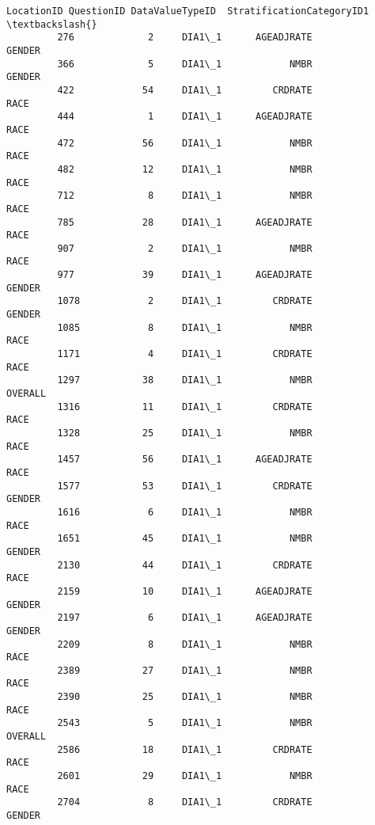 \documentclass[11pt]{article}
\begin{document}
\begin{Verbatim}[commandchars=\\\{\}]
                LocationID QuestionID DataValueTypeID  StratificationCategoryID1  \textbackslash{}
         276             2     DIA1\_1      AGEADJRATE                     GENDER   
         366             5     DIA1\_1            NMBR                     GENDER   
         422            54     DIA1\_1         CRDRATE                       RACE   
         444             1     DIA1\_1      AGEADJRATE                       RACE   
         472            56     DIA1\_1            NMBR                       RACE   
         482            12     DIA1\_1            NMBR                       RACE   
         712             8     DIA1\_1            NMBR                       RACE   
         785            28     DIA1\_1      AGEADJRATE                       RACE   
         907             2     DIA1\_1            NMBR                       RACE   
         977            39     DIA1\_1      AGEADJRATE                     GENDER   
         1078            2     DIA1\_1         CRDRATE                     GENDER   
         1085            8     DIA1\_1            NMBR                       RACE   
         1171            4     DIA1\_1         CRDRATE                       RACE   
         1297           38     DIA1\_1            NMBR                    OVERALL   
         1316           11     DIA1\_1         CRDRATE                       RACE   
         1328           25     DIA1\_1            NMBR                       RACE   
         1457           56     DIA1\_1      AGEADJRATE                       RACE   
         1577           53     DIA1\_1         CRDRATE                     GENDER   
         1616            6     DIA1\_1            NMBR                       RACE   
         1651           45     DIA1\_1            NMBR                     GENDER   
         2130           44     DIA1\_1         CRDRATE                       RACE   
         2159           10     DIA1\_1      AGEADJRATE                     GENDER   
         2197            6     DIA1\_1      AGEADJRATE                     GENDER   
         2209            8     DIA1\_1            NMBR                       RACE   
         2389           27     DIA1\_1            NMBR                       RACE   
         2390           25     DIA1\_1            NMBR                       RACE   
         2543            5     DIA1\_1            NMBR                    OVERALL   
         2586           18     DIA1\_1         CRDRATE                       RACE   
         2601           29     DIA1\_1            NMBR                       RACE   
         2704            8     DIA1\_1         CRDRATE                     GENDER   

\end{Verbatim}
\end{document}
